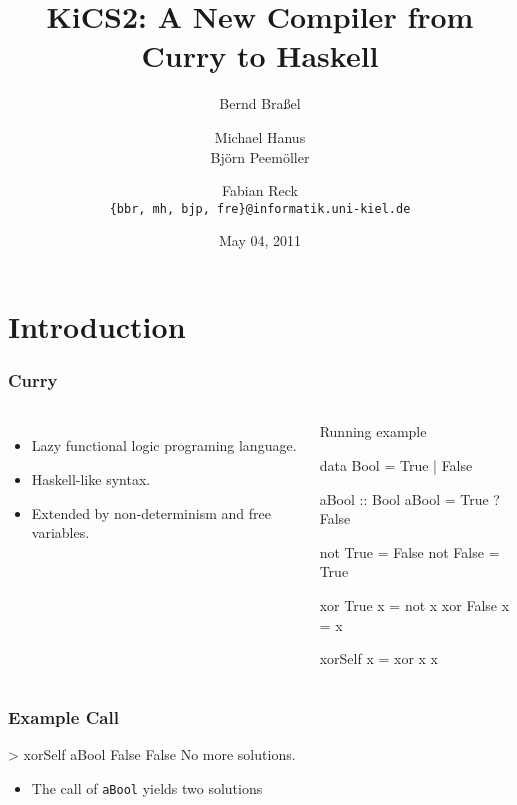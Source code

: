 \documentclass[utf8,handout]{beamer}
\begin{document}
\title[KiCS2]{KiCS2: A New Compiler from Curry to Haskell}

\date{May 04, 2011}

\author[B. Braßel, M. Hanus, B. Peemöller, F. Reck]
 {Bernd Braßel \and Michael Hanus \\
   Björn Peemöller \and Fabian Reck\\
  \texttt{\{bbr, mh, bjp, fre\}@informatik.uni-kiel.de}}


\begin{frame}
  \titlepage
\end{frame}

\section{Introduction}

\begin{frame}[fragile]
\frametitle{Curry}
\begin{columns}
\begin{itemize}
\item Lazy functional logic programing language.
\item Haskell-like syntax.
\item Extended by non-determinism and free variables. %
\end{itemize}
\begin{block}{Running example}
\begin{semiverbatim}
data Bool = True | False

aBool :: Bool
aBool = True ? False

not True  = False
not False = True

xor True  x = not x
xor False x = x

xorSelf x = xor x x
\end{semiverbatim}
\end{block}
\end{columns}
\end{frame}

\begin{frame}[fragile]
\frametitle{Example Call}
\begin{semiverbatim}
> xorSelf aBool
False
False
No more solutions.
\end{semiverbatim}
\begin{itemize}
\item The call of \verb!aBool! yields two solutions
\end{itemize}
\end{frame}
\end{document}
